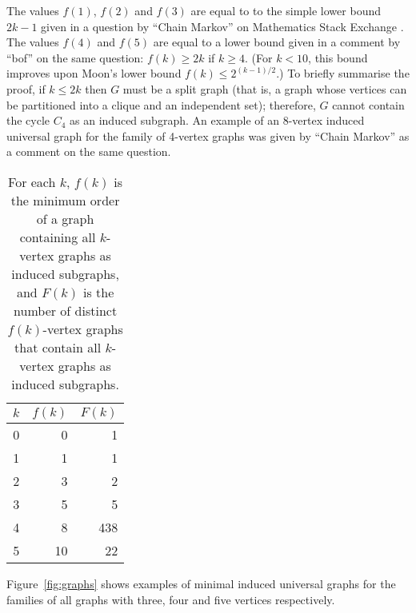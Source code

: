 \documentclass[12pt]{article}
\begin{document}
The values $f(1)$, $f(2)$ and $f(3)$ are equal to to the simple lower bound $2k
- 1$ given in a question by ``Chain Markov'' on Mathematics Stack Exchange
  \cite{math_se_question}.  The values $f(4)$ and $f(5)$ are equal to a lower
  bound given in a comment by ``bof'' on the same question: $f(k) \geq 2k$ if $k
  \geq 4$.  (For $k < 10$, this bound improves upon Moon's lower bound $f(k)
  \leq 2^{(k-1)/2}$.) To briefly summarise the proof, if $k \leq 2k$ then $G$
  must be a split graph (that is, a graph whose vertices can be partitioned
  into a clique and an independent set); therefore, $G$ cannot contain the
  cycle $C_4$ as an induced subgraph.  An example of an 8-vertex induced
  universal graph for the family of 4-vertex graphs was given by ``Chain
  Markov'' as a comment on the same question.

\begin{table}[h!]
\centering
\begin{tabular}{r r r}
 \toprule
 $k$ & $f(k)$ & $F(k)$ \\ [0.5ex]
 \midrule
 0 & 0 & 1 \\
 1 & 1 & 1 \\
 2 & 3 & 2 \\
 3 & 5 & 5 \\
 4 & 8 & 438 \\
 5 & 10 & 22 \\
 \bottomrule
\end{tabular}
\caption{For each $k$, $f(k)$ is the minimum order of a graph containing all $k$-vertex graphs as
induced subgraphs, and $F(k)$ is the number of distinct $f(k)$-vertex graphs that contain
all $k$-vertex graphs as induced subgraphs.}
\label{tab:graphresults}
\end{table}
%
%

Figure~\ref{fig:graphs} shows examples of minimal induced universal graphs
for the families of all graphs with three, four and five vertices
respectively.
\end{document}
